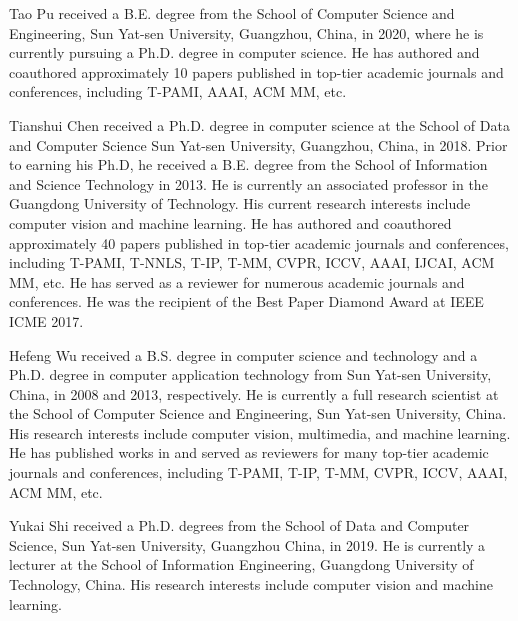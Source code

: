 \documentclass[lettersize,journal]{IEEEtran}
\begin{document}



\newpage

\begin{IEEEbiography}{Tao Pu} received a B.E. degree from the School of Computer Science and Engineering, Sun Yat-sen University, Guangzhou, China, in 2020, where he is currently pursuing a Ph.D. degree in computer science. He has authored and coauthored approximately 10 papers published in top-tier academic journals and conferences, including T-PAMI, AAAI, ACM MM, etc.\end{IEEEbiography}

\begin{IEEEbiography}{Tianshui Chen} received a Ph.D. degree in computer science at the School of Data and Computer Science Sun Yat-sen University, Guangzhou, China, in 2018. Prior to earning his Ph.D, he received a B.E. degree from the School of Information and Science Technology in 2013. He is currently an associated professor in the Guangdong University of Technology. His current research interests include computer vision and machine learning. He has authored and coauthored approximately 40 papers published in top-tier academic journals and conferences, including T-PAMI, T-NNLS, T-IP, T-MM, CVPR, ICCV, AAAI, IJCAI, ACM MM, etc. He has served as a reviewer for numerous academic journals and conferences. He was the recipient of the Best Paper Diamond Award at IEEE ICME 2017. \end{IEEEbiography}

\begin{IEEEbiography}{Hefeng Wu} received a B.S. degree in computer science and technology and a Ph.D. degree in computer application technology from Sun Yat-sen University, China, in 2008 and 2013, respectively. He is currently a full research scientist at the School of Computer Science and Engineering, Sun Yat-sen University, China. His research interests include computer vision, multimedia, and machine learning. He has published works in and served as reviewers for many top-tier academic journals and conferences, including T-PAMI, T-IP, T-MM, CVPR, ICCV, AAAI, ACM MM, etc. \end{IEEEbiography}

\begin{IEEEbiography}{Yukai Shi}
received a Ph.D. degrees from the School of Data and Computer Science, Sun Yat-sen University, Guangzhou China, in 2019. He is currently a lecturer at the School of Information Engineering, Guangdong University of Technology, China. His research interests include computer vision and machine learning.
\end{IEEEbiography}
\end{document}
